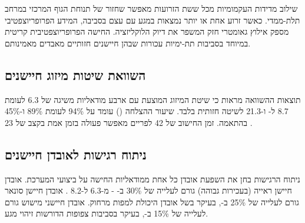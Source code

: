 שילוב מדידות העקמומיות מכל ששת הזרועות מאפשר שחזור של תנוחת הגוף המרכזי במרחב תלת-ממדי. כאשר זרוע אחת או יותר נמצאות במגע עם עצם בסביבה, המידע הפרופריוצפטיבי מספק אילוץ גאומטרי חזק המשפר את דיוק הלוקליזציה. החישה הפרופריוצפטיבית קריטית במיוחד בסביבות תת-ימיות עכורות שבהן חיישנים חזותיים מאבדים מאמינותם.

\subsection{השוואת שיטות מיזוג חיישנים}
\label{sec:ch05_comparison}

\begin{table}[htbp]
\centering
\caption{השוואת אסטרטגיות מיזוג חיישנים:  לעומת פילטר חלקיקים לעומת גרף פקטורים לעומת למידה עמוקה}
\label{tab:ch05_fusion_comparison}
\end{table}

תוצאות ההשוואה מראות כי שיטת המיזוג המוצעת עם ארבע מודאליות משיגה  של 6.3  לעומת 8.7  ל- \cite{Rahman2019} ו-21.3  לשיטה חזותית בלבד. שיעור ההצלחה () עומד על 94\% לעומת 89\% ו-45\% בהתאמה. זמן החישוב של 42  לפריים מאפשר פעולה בזמן אמת בקצב של 23 .

\subsection{ניתוח רגישות לאובדן חיישנים}
\label{sec:ch05_sensitivity}

ניתוח הרגישות בחן את השפעת אובדן כל אחת ממודאליות החישה על ביצועי המערכת. אובדן חיישן ראייה (בעכירות גבוהה) גורם לעלייה של 30\% ב- - מ-6.3  ל-8.2 . אובדן חיישן סונאר גורם לעלייה של 25\% ב-, בעיקר בשל אובדן היכולת למפות מרחוק. אובדן חיישני מישוש גורם לעלייה של 15\% ב-, בעיקר בסביבות צפופות הדורשות זיהוי מגע.

